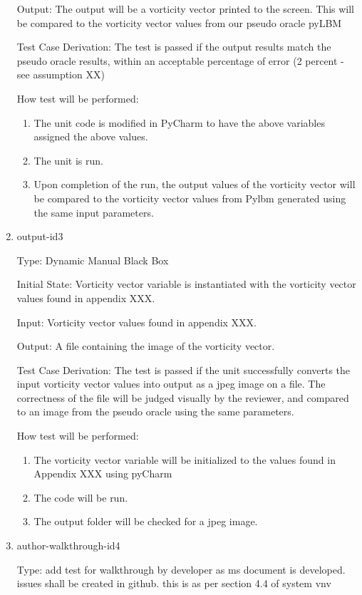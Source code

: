 \documentclass[12pt, titlepage]{article}
\begin{document}
\begin{enumerate}
Output: The output will be a vorticity vector printed to the screen. This will be compared to the vorticity vector values from our pseudo oracle pyLBM

Test Case Derivation: The test is passed if the output results match the pseudo oracle results, within an acceptable percentage of error (2 percent - see assumption XX)

How test will be performed: 
\begin{enumerate}
\item The unit code is modified in PyCharm to have the above variables assigned the above values.
\item The unit is run.
\item Upon completion of the run, the output values of the vorticity vector will be compared to the vorticity vector values from Pylbm generated using the same input parameters.
\end{enumerate}

\item{output-id3\\}

Type: Dynamic Manual Black Box
					
Initial State: Vorticity vector variable is instantiated with the vorticity vector values found in appendix XXX.
					
Input: Vorticity vector values found in appendix XXX.
					
Output: A file containing the image of the vorticity vector.

Test Case Derivation: The test is passed if the unit successfully converts the input vorticity vector values into output as a jpeg image on a file. The correctness of the file will be judged visually by the reviewer, and compared to an image from the pseudo oracle using the same parameters.

How test will be performed: 
\begin{enumerate}
\item The vorticity vector variable will be initialized to the values found in Appendix XXX using pyCharm
\item The code will be run.
\item The output folder will be checked for a jpeg image.
\end{enumerate}

\item{author-walkthrough-id4\\}

Type: add test for walkthrough by developer as ms document is developed. issues shall be created in github. this is as per section 4.4 of system vnv
					

\end{enumerate}
\end{document}
